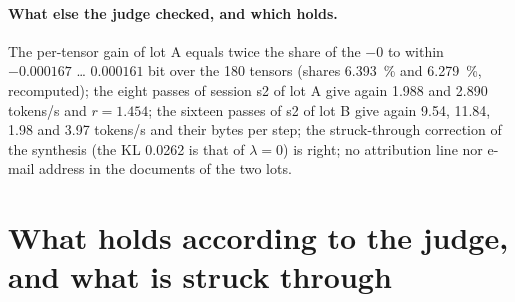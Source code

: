 \paragraph{What else the judge checked, and which holds.} The per-tensor gain of lot A equals twice the share of the $-0$ to within $\num{-0.000167}$ … $\num{0.000161}$ bit over the 180 tensors (shares \SI{6.393}{\percent} and \SI{6.279}{\percent}, recomputed); the eight passes of session s2 of lot A give again \num{1.988} and \num{2.890} tokens/s and $r = \num{1.454}$; the sixteen passes of s2 of lot B give again \num{9.54}, \num{11.84}, \num{1.98} and \num{3.97} tokens/s and their bytes per step; the struck-through correction of the synthesis (the KL \num{0.0262} is that of $\lambda = 0$) is right; no attribution line nor e-mail address in the documents of the two lots.

\section{What holds according to the judge, and what is struck through}\label{t3jug:sec:bilan}

